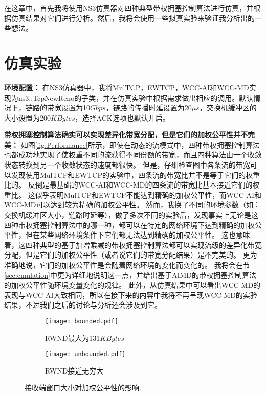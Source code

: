 \documentclass[winfonts]{njuthesis}
\begin{document}
在这章中，首先我将使用NS3仿真器\cite{NS3}对四种典型带权拥塞控制算法进行仿真，并根据仿真结果对它们进行分析。然后，我将会使用一些拟真实验来验证我分析出的一些想法。

\section{仿真实验}
\label{sec:simulation}

\textbf{环境配置：}
在NS3仿真器中，我将MulTCP，EWTCP，WCC-AI和WCC-MD实现为ns3::TcpNewReno的子类，并在仿真实验中根据需求做出相应的调用。默认情况下，链路的带宽设置为10$Gbps$，链路的传播时延设置为20$\mu s$，交换机缓冲区的大小设置为200$KBytes$，选择ACK选项也默认开启。

\textbf{带权拥塞控制算法确实可以实现差异化带宽分配，但是它们的加权公平性并不完美：}
如图\ref{fig:Performance}所示，即使在动态的流模式中，四种带权拥塞控制算法也都成功地实现了使权重不同的流获得不同份额的带宽，而且四种算法由一个收敛状态转换到另一个收敛状态的速度都很快。
但是，仔细检查图中各条流的带宽可以发现使用MulTCP和EWTCP的实验中，四条流的带宽比并不是等于它们的权重比的。
反倒是最基础的WCC-AI和WCC-MD的四条流的带宽比基本接近它们的权重比。
这似乎表明MulTCP和EWTCP不能达到精确的加权公平性，而WCC-AI和WCC-MD可以达到较为精确的加权公平性。
然而，我换了不同的环境参数（如：交换机缓冲区大小，链路时延等），做了多次不同的实验后，发现事实上无论是这四种带权拥塞控制算法中的哪一种，都可以在特定的网络环境下达到精确的加权公平性，但在某些网络环境条件下它们都无法达到精确的加权公平性。
这也意味着，这四种典型的基于加增乘减的带权拥塞控制算法都可以实现流级的差异化带宽分配，但是它们的加权公平性（或者说它们的带宽分配结果）是不完美的。
更为准确地说，它们的加权公平性是会随着网络环境的变化而变化的。
我将会在节\ref{sec:emulation}中更为详细地说明这一点，并给出基于AIMD的带权拥塞控制算法的加权公平性随环境变量变化的规律。
此外，从仿真结果中可以看出WCC-MD的表现与WCC-AI大致相同，所以在接下来的内容中我将不再呈现WCC-MD的实验结果，不过我们之后的讨论与分析还会涉及到它。

\begin{figure}[ht]
	\begin{subfigure}{.5\textwidth}
    \centering
    \texttt{[image: bounded.pdf]}
    \caption{RWND最大为131$KBytes$}
		\label{fig:BoundedCwnd}
  \end{subfigure}
	\begin{subfigure}{.5\textwidth}
		\centering
    \texttt{[image: unbounded.pdf]}
    \caption{RWND接近无穷大}
		\label{fig:UnbounedCwnd}
  \end{subfigure}
	\caption{接收端窗口大小对加权公平性的影响.}
	\label{fig:EndHostBuffer}
\end{figure}
\end{document}
